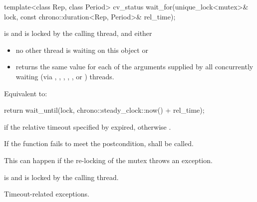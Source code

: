 
%
\begin{itemdecl}
template<class Rep, class Period>
  cv_status wait_for(unique_lock<mutex>& lock,
                     const chrono::duration<Rep, Period>& rel_time);
\end{itemdecl}
\begin{itemdescr}
 \pnum \requires {} is  and 
        is locked by the calling thread, and either
        \begin{itemize}
         \item no other thread is waiting on this  object or
         \item {} returns the same value for each of the  arguments
                supplied by all concurrently waiting (via ,
                , 
                {\color{insertcolor}, , , or }) threads.
        \end{itemize}

 \pnum \effects Equivalent to:
\begin{codeblock}
return wait_until(lock, chrono::steady_clock::now() + rel_time);
\end{codeblock}

 \pnum \returns {} if
                the relative timeout specified by  expired,
                otherwise .

 \pnum \remarks
                If the function fails to meet the postcondition, 
                shall be called.
                \begin{note} This can happen if the re-locking of the mutex throws an exception. \end{note}

 \pnum \postconditions {} is  and 
        is locked by the calling thread.

 \pnum \throws Timeout-related exceptions.
\end{itemdescr}


